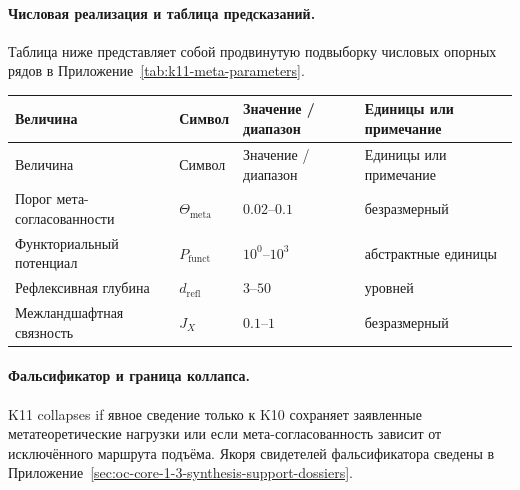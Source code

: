 \paragraph{Числовая реализация и таблица предсказаний.}
Таблица ниже представляет собой продвинутую подвыборку числовых опорных рядов в Приложение~\ref{tab:k11-meta-parameters}.
\begin{longtable}{@{}L{0.27\textwidth}L{0.15\textwidth}L{0.24\textwidth}L{0.16\textwidth}@{}}
\toprule
Величина & Символ & Значение / диапазон & Единицы или примечание \\
\midrule
\endfirsthead
\toprule
Величина & Символ & Значение / диапазон & Единицы или примечание \\
\midrule
\endhead
Порог мета-согласованности & $\scriptstyle \Theta_{\mathrm{meta}}$ & $0.02\text{--}0.1$ & безразмерный \\
Функториальный потенциал & $\scriptstyle P_{\mathrm{funct}}$ & $10^0\text{--}10^3$ & абстрактные единицы \\
Рефлексивная глубина & $\scriptstyle d_{\mathrm{refl}}$ & $3\text{--}50$ & уровней \\
Межландшафтная связность & $\scriptstyle J_X$ & $0.1\text{--}1$ & безразмерный \\
\bottomrule
\end{longtable}

\paragraph{Фальсификатор и граница коллапса.}
K11 collapses if явное сведение только к K10 сохраняет заявленные метатеоретические нагрузки или если мета-согласованность зависит от исключённого маршрута подъёма.
Якоря свидетелей фальсификатора сведены в Приложение~\ref{sec:oc-core-1-3-synthesis-support-dossiers}.

